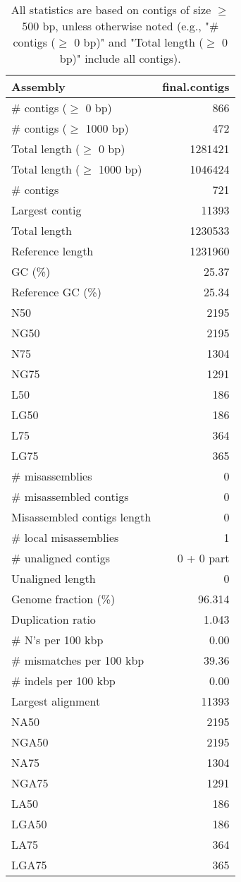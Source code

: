 \documentclass[12pt,a4paper]{article}
\begin{document}
\begin{table}[ht]
\begin{center}
\caption{All statistics are based on contigs of size $\geq$ 500 bp, unless otherwise noted (e.g., "\# contigs ($\geq$ 0 bp)" and "Total length ($\geq$ 0 bp)" include all contigs).}
\begin{tabular}{|l*{1}{|r}|}
\hline
Assembly & final.contigs \\ \hline
\# contigs ($\geq$ 0 bp) & 866 \\ \hline
\# contigs ($\geq$ 1000 bp) & 472 \\ \hline
Total length ($\geq$ 0 bp) & 1281421 \\ \hline
Total length ($\geq$ 1000 bp) & 1046424 \\ \hline
\# contigs & 721 \\ \hline
Largest contig & 11393 \\ \hline
Total length & 1230533 \\ \hline
Reference length & 1231960 \\ \hline
GC (\%) & 25.37 \\ \hline
Reference GC (\%) & 25.34 \\ \hline
N50 & 2195 \\ \hline
NG50 & 2195 \\ \hline
N75 & 1304 \\ \hline
NG75 & 1291 \\ \hline
L50 & 186 \\ \hline
LG50 & 186 \\ \hline
L75 & 364 \\ \hline
LG75 & 365 \\ \hline
\# misassemblies & 0 \\ \hline
\# misassembled contigs & 0 \\ \hline
Misassembled contigs length & 0 \\ \hline
\# local misassemblies & 1 \\ \hline
\# unaligned contigs & 0 + 0 part \\ \hline
Unaligned length & 0 \\ \hline
Genome fraction (\%) & 96.314 \\ \hline
Duplication ratio & 1.043 \\ \hline
\# N's per 100 kbp & 0.00 \\ \hline
\# mismatches per 100 kbp & 39.36 \\ \hline
\# indels per 100 kbp & 0.00 \\ \hline
Largest alignment & 11393 \\ \hline
NA50 & 2195 \\ \hline
NGA50 & 2195 \\ \hline
NA75 & 1304 \\ \hline
NGA75 & 1291 \\ \hline
LA50 & 186 \\ \hline
LGA50 & 186 \\ \hline
LA75 & 364 \\ \hline
LGA75 & 365 \\ \hline
\end{tabular}
\end{center}
\end{table}
\end{document}
